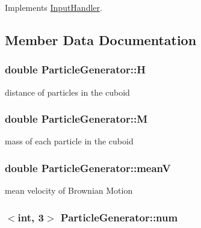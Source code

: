 Implements \hyperlink{classInputHandler_a3df9656547550dc55ecf8400ff03307d}{Input\+Handler}.



\subsection{Member Data Documentation}
\hypertarget{classParticleGenerator_ab8972c20c48ec8a4b3dd8f216e127f19}{
\subsubsection[{H}]{\setlength{\rightskip}{0pt plus 5cm}double Particle\+Generator\+::\+H\hspace{0.3cm}{\ttfamily [private]}}}\label{classParticleGenerator_ab8972c20c48ec8a4b3dd8f216e127f19}
distance of particles in the cuboid \hypertarget{classParticleGenerator_a7b91b2f1e4cd7ef3b04fac4923f46490}{
\subsubsection[{M}]{\setlength{\rightskip}{0pt plus 5cm}double Particle\+Generator\+::\+M\hspace{0.3cm}{\ttfamily [private]}}}\label{classParticleGenerator_a7b91b2f1e4cd7ef3b04fac4923f46490}
mass of each particle in the cuboid \hypertarget{classParticleGenerator_ae399ed7c0cc1e2a6f467f2fd2a8d96ad}{
\subsubsection[{mean\+V}]{\setlength{\rightskip}{0pt plus 5cm}double Particle\+Generator\+::mean\+V\hspace{0.3cm}{\ttfamily [private]}}}\label{classParticleGenerator_ae399ed7c0cc1e2a6f467f2fd2a8d96ad}
mean velocity of Brownian Motion \hypertarget{classParticleGenerator_a44e5ef018a25b22a109418374b60ff7f}{
\subsubsection[{num}]{$<$int, 3$>$ Particle\+Generator\+::num\hspace{0.3cm}{\ttfamily [private]}}}\label{classParticleGenerator_a44e5ef018a25b22a109418374b60ff7f}
